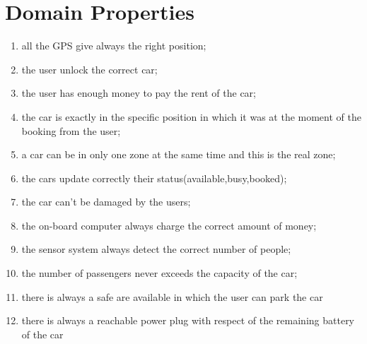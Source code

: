 \section{Domain Properties}
\begin{enumerate}
	\item all the GPS give always the right position;
	\item the user unlock the correct car;
	\item the user has enough money to pay the rent of the car;
	\item the car is exactly in the specific position in which it was at the moment of the booking from the user;
	\item a car can be in only one zone at the same time and this is the real zone;
	\item the cars update correctly their status(available,busy,booked);
    \item the car can't be damaged by the users;
    \item the on-board computer always charge the correct amount of money;
    \item the sensor system always detect the correct number of people;
    \item the number of passengers never exceeds the capacity of the car;
    \item there is always a safe are available in which the user can park the car
    \item there is always a reachable power plug with respect of the remaining battery of the car
    
\end{enumerate}
